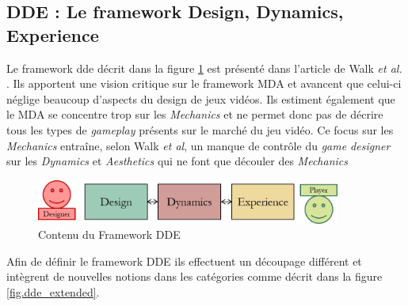 \subsection{DDE : Le framework Design, Dynamics, Experience \cite{DDE}}

Le framework \gls{dde} décrit dans la figure \ref{fig.dde} est présenté dans l'article de Walk \emph{et al.} \cite{DDE}. 
Ils apportent une vision critique sur le framework MDA et avancent que celui-ci néglige beaucoup d'aspects du design de jeux vidéos. 
Ils estiment également que le MDA se concentre trop sur les \emph{Mechanics} et ne permet donc pas de décrire tous les types de \emph{gameplay} présents sur le marché du jeu vidéo. 
Ce focus sur les \emph{Mechanics} entraîne, selon Walk \emph{et al}, un manque de contrôle du \emph{game designer} sur les \emph{Dynamics} et \emph{Aesthetics} qui ne font que découler des \emph{Mechanics}

\begin{figure}[H]
    \begin{center}
    \includegraphics[width=10cm]{10_img/chap3/dde.png} 
    \caption{Contenu du Framework DDE \cite{DDE}}
    \label{fig.dde}
    \end{center}
\end{figure}

Afin de définir le framework DDE ils effectuent un découpage différent et intègrent de nouvelles notions dans les catégories comme décrit dans la figure \ref{fig.dde_extended}.

